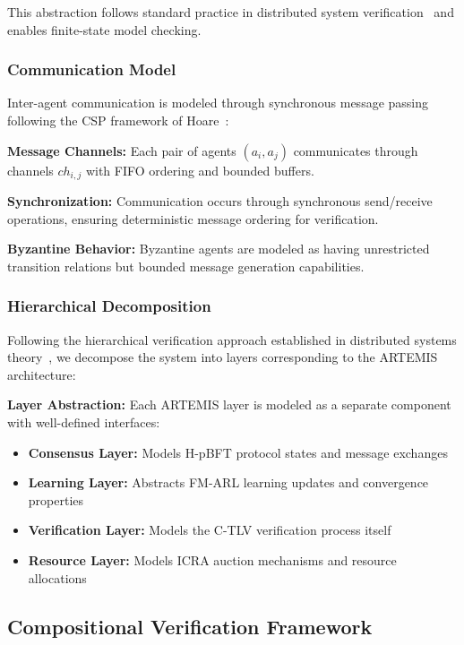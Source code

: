 \documentclass[conference]{IEEEtran}
\begin{document}
This abstraction follows standard practice in distributed system verification~\cite{lynch1996distributed} and enables finite-state model checking.

\subsubsection{Communication Model}

Inter-agent communication is modeled through synchronous message passing following the CSP framework of Hoare~\cite{hoare1978communicating}:

\textbf{Message Channels:} Each pair of agents $(a_i, a_j)$ communicates through channels $ch_{i,j}$ with FIFO ordering and bounded buffers.

\textbf{Synchronization:} Communication occurs through synchronous send/receive operations, ensuring deterministic message ordering for verification.

\textbf{Byzantine Behavior:} Byzantine agents are modeled as having unrestricted transition relations but bounded message generation capabilities.

\subsubsection{Hierarchical Decomposition}

Following the hierarchical verification approach established in distributed systems theory~\cite{lynch1996distributed}, we decompose the system into layers corresponding to the ARTEMIS architecture:

\textbf{Layer Abstraction:} Each ARTEMIS layer is modeled as a separate component with well-defined interfaces:
\begin{itemize}
    \item \textbf{Consensus Layer:} Models H-pBFT protocol states and message exchanges
    \item \textbf{Learning Layer:} Abstracts FM-ARL learning updates and convergence properties
    \item \textbf{Verification Layer:} Models the C-TLV verification process itself
    \item \textbf{Resource Layer:} Models ICRA auction mechanisms and resource allocations
\end{itemize}

\subsection{Compositional Verification Framework}
\end{document}

